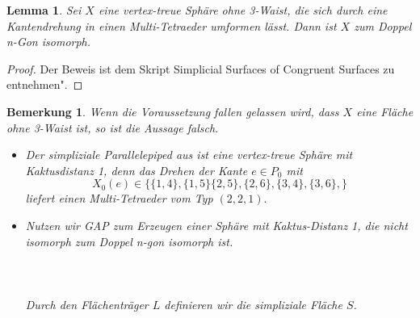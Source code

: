 \documentclass[12pt,titlepage,twoside,cleardoublepage]{article}
\theoremstyle{nummermitklammern}
\newtheorem{lemma}[temp]{Lemma}
\newtheorem{bemerkung}[temp]{Bemerkung}
\newtheorem{lemma}[zahl]{Lemma}
\newtheorem{bemerkung}[zahl]{Bemerkung}
\numberwithin{equation}{section}
\begin{document}
\begin{lemma}
Sei $X$ eine vertex-treue Sphäre ohne 3-Waist, die  sich durch eine Kantendrehung in einen Multi-Tetraeder umformen lässt. Dann ist $X$  zum Doppel n-Gon isomorph.
\end{lemma} 
\begin{proof}
Der Beweis ist dem Skript  Simplicial Surfaces of Congruent Surfaces zu entnehmen".
\end{proof}
\begin{bemerkung}
Wenn die Voraussetzung fallen gelassen wird, dass $X$ eine Fläche ohne 3-Waist ist, so ist die Aussage falsch. 
\begin{itemize}
\item Der simpliziale Parallelepiped aus  ist eine vertex-treue Sphäre mit Kaktusdistanz 1, denn das Drehen der Kante $e\in P_0$ mit 
\[
X_0(e)\in\{\{1,4\},\{1,5\}\{2,5\},\{2,6\},\{3,4\},\{3,6\},\}
\] liefert einen Multi-Tetraeder vom Typ $(2,2,1).$
\item Nutzen wir GAP zum Erzeugen einer Sphäre mit Kaktus-Distanz 1, die nicht isomorph zum Doppel n-gon isomorph ist. \\\\
\fbox{
\parbox{13.4cm}{
\textcolor{red}{$gap>$} \textcolor{blue}{$L:=[[ 2, 3, 5 ], [ 2, 4, 5 ], [ 3, 4, 5 ], [ 1, 3, 6 ], [ 1, 4, 6 ], 
  [ 3, 4, 6 ], [ 1, 7, 8 ], [ 1, 4, 7 ],\newline [ 2, 4, 7 ], [ 2, 7, 8 ], [ 1, 3, 8 ], [ 2, 3, 8 ] ];;$}
  }}\\\\
  Durch den Flächenträger $L$ definieren wir die simpliziale Fläche $S$.\\\\
  \\\\

\end{itemize}
\end{bemerkung}
\end{document}
